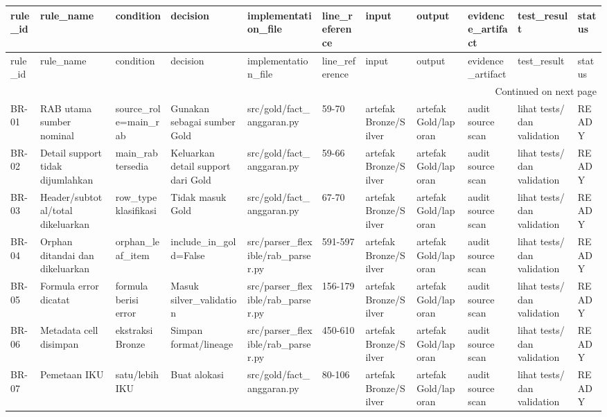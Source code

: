 \begingroup
\scriptsize
\begin{longtable}{lllllllllll}
\toprule
rule_id & rule_name & condition & decision & implementation_file & line_reference & input & output & evidence_artifact & test_result & status \\
\midrule
\endfirsthead
\toprule
rule_id & rule_name & condition & decision & implementation_file & line_reference & input & output & evidence_artifact & test_result & status \\
\midrule
\endhead
\midrule
\multicolumn{11}{r}{Continued on next page} \\
\midrule
\endfoot
\bottomrule
\endlastfoot
BR-01 & RAB utama sumber nominal & source\_role=main\_rab & Gunakan sebagai sumber Gold & src/gold/fact\_anggaran.py & 59-70 & artefak Bronze/Silver & artefak Gold/laporan & audit source scan & lihat tests/ dan validation & READY \\
BR-02 & Detail support tidak dijumlahkan & main\_rab tersedia & Keluarkan detail support dari Gold & src/gold/fact\_anggaran.py & 59-66 & artefak Bronze/Silver & artefak Gold/laporan & audit source scan & lihat tests/ dan validation & READY \\
BR-03 & Header/subtotal/total dikeluarkan & row\_type klasifikasi & Tidak masuk Gold & src/gold/fact\_anggaran.py & 67-70 & artefak Bronze/Silver & artefak Gold/laporan & audit source scan & lihat tests/ dan validation & READY \\
BR-04 & Orphan ditandai dan dikeluarkan & orphan\_leaf\_item & include\_in\_gold=False & src/parser\_flexible/rab\_parser.py & 591-597 & artefak Bronze/Silver & artefak Gold/laporan & audit source scan & lihat tests/ dan validation & READY \\
BR-05 & Formula error dicatat & formula berisi error & Masuk silver\_validation & src/parser\_flexible/rab\_parser.py & 156-179 & artefak Bronze/Silver & artefak Gold/laporan & audit source scan & lihat tests/ dan validation & READY \\
BR-06 & Metadata cell disimpan & ekstraksi Bronze & Simpan format/lineage & src/parser\_flexible/rab\_parser.py & 450-610 & artefak Bronze/Silver & artefak Gold/laporan & audit source scan & lihat tests/ dan validation & READY \\
BR-07 & Pemetaan IKU & satu/lebih IKU & Buat alokasi & src/gold/fact\_anggaran.py & 80-106 & artefak Bronze/Silver & artefak Gold/laporan & audit source scan & lihat tests/ dan validation & READY \\

\end{longtable}
